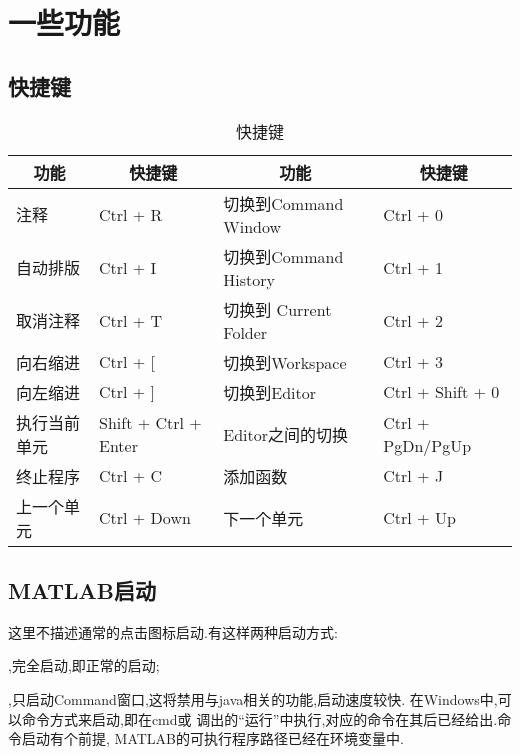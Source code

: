 \section{一些功能}

\subsection{快捷键}

\begin{center}
\begin{table}[htbp!]
  \centering
  \caption{快捷键}
    \begin{tabular}{ll|ll}
    \toprule
    \multicolumn{1}{c}{功能}    & \multicolumn{1}{c}{快捷键}   & \multicolumn{1}{c}{功能}    & \multicolumn{1}{c}{快捷键}\\
    \midrule
    注释          & Ctrl + R              & 切换到Command Window   & Ctrl + 0  \\
    自动排版      & Ctrl + I              & 切换到Command History  & Ctrl + 1 \\
    取消注释      & Ctrl + T              & 切换到 Current Folder  & Ctrl + 2  \\
    向右缩进      & Ctrl + [              & 切换到Workspace        & Ctrl + 3 \\
    向左缩进      & Ctrl + ]              & 切换到Editor           & Ctrl + Shift + 0 \\
    执行当前单元  & Shift + Ctrl + Enter  & Editor之间的切换       & Ctrl + PgDn/PgUp \\
    终止程序      & Ctrl + C              & 添加函数               & Ctrl + J \\
    上一个单元    & Ctrl + Down           & 下一个单元             & Ctrl + Up \\
    \bottomrule
    \end{tabular}%
\end{table}%
\end{center}



\subsection{MATLAB启动}
这里不描述通常的点击图标启动.有这样两种启动方式:
\begindot
  \item {},完全启动,即正常的启动;
  \item {},只启动Command窗口,这将禁用与java相关的功能,启动速度较快.
\myenddot
在Windows中,可以命令方式来启动,即在cmd或  调出的“运行”中执行,对应的命令在其后已经给出.命令启动有个前提, MATLAB的可执行程序路径已经在环境变量中.\par


